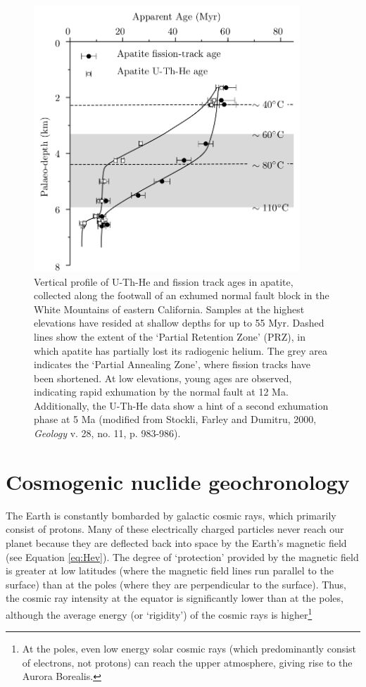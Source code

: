 \documentclass{book}
\newif\ifpdf
\begin{document}
\begin{figure}[!ht]
  \centering
  \ifpdf
  \def\svgwidth{\textwidth}
  
  \else
  \includegraphics[width=10cm]{stockli.png}
  \fi
  \caption{Vertical profile of U-Th-He and fission track ages in
    apatite, collected along the footwall of an exhumed normal fault
    block in the White Mountains of eastern California. Samples at the
    highest elevations have resided at shallow depths for up to 55
    Myr. Dashed lines show the extent of the `Partial Retention Zone'
    (PRZ), in which apatite has partially lost its radiogenic
    helium. The grey area indicates the `Partial Annealing Zone',
    where fission tracks have been shortened. At low elevations, young
    ages are observed, indicating rapid exhumation by the normal fault
    at 12 Ma. Additionally, the U-Th-He data show a hint of a second
    exhumation phase at 5 Ma (modified from Stockli, Farley and
    Dumitru, 2000, \textit{Geology} v. 28, no. 11, p. 983-986).}
  \label{fig:stockli}
\end{figure}

\chapter[Cosmogenic Nuclides]{Cosmogenic nuclide geochronology}
\label{sec:cosmo}

The Earth is constantly bombarded by galactic cosmic rays, which
primarily consist of protons. Many of these electrically charged
particles never reach our planet because they are deflected back into
space by the Earth's magnetic field (see Equation \ref{eq:Hev}). The
degree of `protection' provided by the magnetic field is greater at
low latitudes (where the magnetic field lines run parallel to the
surface) than at the poles (where they are perpendicular to the
surface). Thus, the cosmic ray intensity at the equator is
significantly lower than at the poles, although the average energy (or
`rigidity') of the cosmic rays is higher\footnote{At the poles, even
  low energy solar cosmic rays (which predominantly consist of
  electrons, not protons) can reach the upper atmosphere, giving rise
  to the Aurora Borealis.}\\
\end{document}
